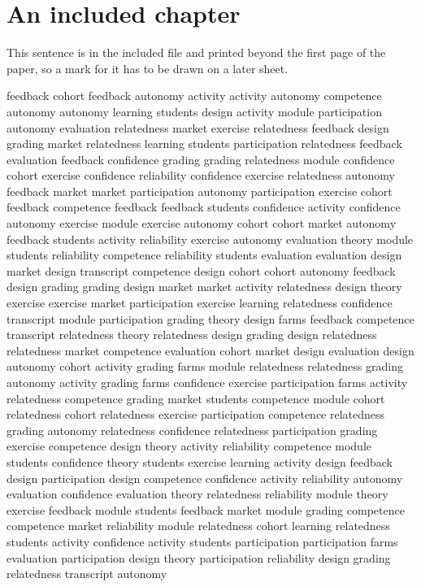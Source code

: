 \section{An included chapter}
This sentence is in the included file and printed beyond the first page of the paper,
so a mark for it has to be drawn on a later sheet.

feedback cohort feedback autonomy activity activity autonomy competence autonomy autonomy learning students design activity
module participation autonomy evaluation relatedness market exercise relatedness feedback design grading market relatedness learning
students participation relatedness feedback evaluation feedback confidence grading grading relatedness module confidence cohort exercise
confidence reliability confidence exercise relatedness autonomy feedback market market participation autonomy participation exercise cohort
feedback competence feedback feedback students confidence activity confidence autonomy exercise module exercise autonomy cohort
cohort market autonomy feedback students activity reliability exercise autonomy evaluation theory module students reliability
competence reliability students evaluation evaluation design market design transcript competence design cohort cohort autonomy
feedback design grading grading design market market activity relatedness design theory exercise exercise market
participation exercise learning relatedness confidence transcript module participation grading theory design farms feedback competence
transcript relatedness theory relatedness design grading design relatedness relatedness market competence evaluation cohort market
design evaluation design autonomy cohort activity grading farms module relatedness relatedness grading autonomy activity
grading farms confidence exercise participation farms activity relatedness competence grading market students competence module
cohort relatedness cohort relatedness exercise participation competence relatedness grading autonomy relatedness confidence relatedness participation
grading exercise competence design theory activity reliability competence module students confidence theory students exercise
learning activity design feedback design participation design competence confidence activity reliability autonomy evaluation confidence
evaluation theory relatedness reliability module theory exercise feedback module students feedback market module grading
competence competence market reliability module relatedness cohort learning relatedness students activity confidence activity students
participation participation farms evaluation participation design theory participation reliability design grading relatedness transcript autonomy

